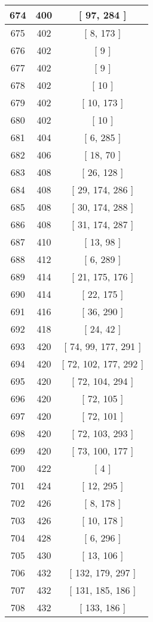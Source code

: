 \begin{center}
\begin{longtable}[H]{|| c c c ||}
674 & 400 & [ 97, 284 ] \\ 
\hline
675 & 402 & [ 8, 173 ] \\ 
\hline
676 & 402 & [ 9 ] \\ 
\hline
677 & 402 & [ 9 ] \\ 
\hline
678 & 402 & [ 10 ] \\ 
\hline
679 & 402 & [ 10, 173 ] \\ 
\hline
680 & 402 & [ 10 ] \\ 
\hline
681 & 404 & [ 6, 285 ] \\ 
\hline
682 & 406 & [ 18, 70 ] \\ 
\hline
683 & 408 & [ 26, 128 ] \\ 
\hline
684 & 408 & [ 29, 174, 286 ] \\ 
\hline
685 & 408 & [ 30, 174, 288 ] \\ 
\hline
686 & 408 & [ 31, 174, 287 ] \\ 
\hline
687 & 410 & [ 13, 98 ] \\ 
\hline
688 & 412 & [ 6, 289 ] \\ 
\hline
689 & 414 & [ 21, 175, 176 ] \\ 
\hline
690 & 414 & [ 22, 175 ] \\ 
\hline
691 & 416 & [ 36, 290 ] \\ 
\hline
692 & 418 & [ 24, 42 ] \\ 
\hline
693 & 420 & [ 74, 99, 177, 291 ] \\ 
\hline
694 & 420 & [ 72, 102, 177, 292 ] \\ 
\hline
695 & 420 & [ 72, 104, 294 ] \\ 
\hline
696 & 420 & [ 72, 105 ] \\ 
\hline
697 & 420 & [ 72, 101 ] \\ 
\hline
698 & 420 & [ 72, 103, 293 ] \\ 
\hline
699 & 420 & [ 73, 100, 177 ] \\ 
\hline
700 & 422 & [ 4 ] \\ 
\hline
701 & 424 & [ 12, 295 ] \\ 
\hline
702 & 426 & [ 8, 178 ] \\ 
\hline
703 & 426 & [ 10, 178 ] \\ 
\hline
704 & 428 & [ 6, 296 ] \\ 
\hline
705 & 430 & [ 13, 106 ] \\ 
\hline
706 & 432 & [ 132, 179, 297 ] \\ 
\hline
707 & 432 & [ 131, 185, 186 ] \\ 
\hline
708 & 432 & [ 133, 186 ] \\ 

\end{longtable}
\end{center}
